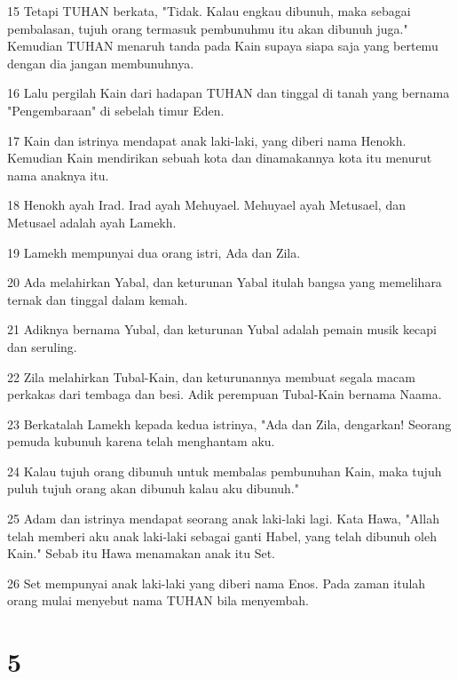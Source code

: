 \par 15 Tetapi TUHAN berkata, "Tidak. Kalau engkau dibunuh, maka sebagai pembalasan, tujuh orang termasuk pembunuhmu itu akan dibunuh juga." Kemudian TUHAN menaruh tanda pada Kain supaya siapa saja yang bertemu dengan dia jangan membunuhnya.
\par 16 Lalu pergilah Kain dari hadapan TUHAN dan tinggal di tanah yang bernama "Pengembaraan" di sebelah timur Eden.
\par 17 Kain dan istrinya mendapat anak laki-laki, yang diberi nama Henokh. Kemudian Kain mendirikan sebuah kota dan dinamakannya kota itu menurut nama anaknya itu.
\par 18 Henokh ayah Irad. Irad ayah Mehuyael. Mehuyael ayah Metusael, dan Metusael adalah ayah Lamekh.
\par 19 Lamekh mempunyai dua orang istri, Ada dan Zila.
\par 20 Ada melahirkan Yabal, dan keturunan Yabal itulah bangsa yang memelihara ternak dan tinggal dalam kemah.
\par 21 Adiknya bernama Yubal, dan keturunan Yubal adalah pemain musik kecapi dan seruling.
\par 22 Zila melahirkan Tubal-Kain, dan keturunannya membuat segala macam perkakas dari tembaga dan besi. Adik perempuan Tubal-Kain bernama Naama.
\par 23 Berkatalah Lamekh kepada kedua istrinya, "Ada dan Zila, dengarkan! Seorang pemuda kubunuh karena telah menghantam aku.
\par 24 Kalau tujuh orang dibunuh untuk membalas pembunuhan Kain, maka tujuh puluh tujuh orang akan dibunuh kalau aku dibunuh."
\par 25 Adam dan istrinya mendapat seorang anak laki-laki lagi. Kata Hawa, "Allah telah memberi aku anak laki-laki sebagai ganti Habel, yang telah dibunuh oleh Kain." Sebab itu Hawa menamakan anak itu Set.
\par 26 Set mempunyai anak laki-laki yang diberi nama Enos. Pada zaman itulah orang mulai menyebut nama TUHAN bila menyembah.

\chapter{5}

